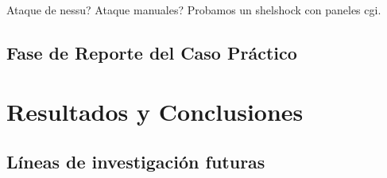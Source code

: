 \documentclass[a4paper, 11pt]{article}
\begin{document}
Ataque de nessu?
Ataque manuales?
Probamos un shelshock con paneles cgi.


\par\vspace{0.5cm}
\subsection{Fase de Reporte del Caso Práctico}




\clearpage
\thispagestyle{nohead}

\section{Resultados y Conclusiones}

\par\vspace{0.5cm}
\subsection{Líneas de investigación futuras}


\clearpage
\thispagestyle{nohead}

\end{document}
